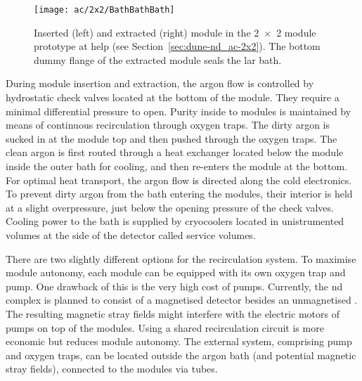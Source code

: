 \begin{figure}[htb]
	\centering
	\texttt{[image: ac/2x2/BathBathBath]}
	\caption[\AC{} module insertion and extraction]{%
		Inserted (left) and extracted (right) \AC{} module in the \num{2 x 2} module prototype at \acrshort{help} (see Section~\ref{sec:dune-nd_ac-2x2}).
		The bottom dummy flange of the extracted module seals the \acrshort{lar} bath.
	}
	\label{fig:ac_module-ins-ext}
\end{figure}

During module insertion and extraction, the argon flow is controlled by hydrostatic check valves located at the bottom of the module.
They require a minimal differential pressure to open.
Purity inside to modules is maintained by means of continuous \lar{} recirculation through oxygen traps.
The dirty argon is sucked in at the module top and then pushed through the oxygen traps.
The clean argon is first routed through a heat exchanger located below the module inside the outer bath for cooling, and then re-enters the module at the bottom.
For optimal heat transport, the argon flow is directed along the cold electronics.
To prevent dirty argon from the bath entering the modules, their interior is held at a slight overpressure, just below the opening pressure of the check valves.
Cooling power to the bath is supplied by cryocoolers located in unistrumented volumes at the side of the detector called service volumes.

There are two slightly different options for the recirculation system.
To maximise module autonomy, each module can be equipped with its own oxygen trap and \lar{} pump.
One drawback of this is the very high cost of \lar{} pumps.
Currently, the \dune{} \gls{nd} complex is planned to consist of a magnetised detector besides an unmagnetised \lartpc{}.
The resulting magnetic stray fields might interfere with the electric motors of \lar{} pumps on top of the modules.
Using a shared recirculation circuit is more economic but reduces module autonomy.
The external system, comprising pump and oxygen traps, can be located outside the argon bath (and potential magnetic stray fields), connected to the modules via tubes.

